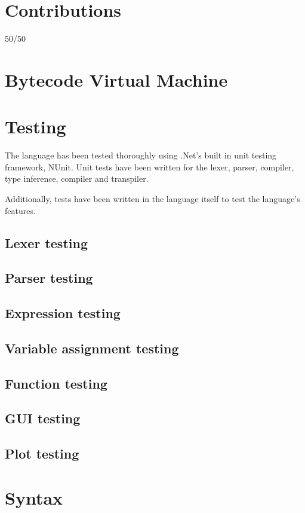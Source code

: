 \documentclass[a4paper, oneside, 11pt]{report}
\begin{document}
\appendix
\chapter{Contributions}\label{ch:contributions}

50/50

\chapter{Bytecode Virtual Machine}\label{ch:compiler}

\chapter{Testing}\label{ch:test}

The language has been tested thoroughly using .Net's built in unit testing framework, NUnit.
Unit tests have been written for the lexer, parser, compiler, type inference, compiler and transpiler.

Additionally, tests have been written in the language itself to test the language's features.

\section{Lexer testing}\label{sec:lexer-testing}

\section{Parser testing}\label{sec:parser-testing}

\section{Expression testing}\label{sec:arithmetic-expression-testing}

\section{Variable assignment testing}\label{sec:variable-assignment-testing}

\section{Function testing}\label{sec:function-testing}

\section{GUI testing}\label{sec:gui-testing}

\section{Plot testing}\label{sec:plot-testing}

\chapter{Syntax}\label{ch:other-stuff}
\end{document}
